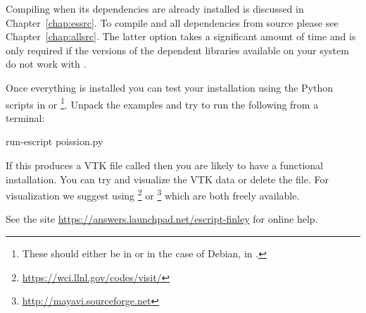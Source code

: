 Compiling \esfinley when its dependencies are already installed is discussed in Chapter~\ref{chap:essrc}.
To compile \esfinley and all dependencies from source please see Chapter~\ref{chap:allsrc}.
The latter option takes a significant amount of time and is only required if the versions of the dependent libraries available on your system do not work with \esfinley.

Once everything is installed you can test your installation using the Python scripts in  or \footnote{These should either be in  or in the case of Debian, in .}.
Unpack the examples and try to run the following from a terminal:
\begin{shellCode}
 run-escript poission.py
\end{shellCode}
If this produces a VTK file called  then you are likely to have a functional \esfinley installation.
You can try and visualize the VTK data or delete the file.
For visualization we suggest using \footnote{\url{https://wci.llnl.gov/codes/visit/}} or \footnote{\url{http://mayavi.sourceforge.net}} which are both freely available.

See the site \url{https://answers.launchpad.net/escript-finley} for online help.
